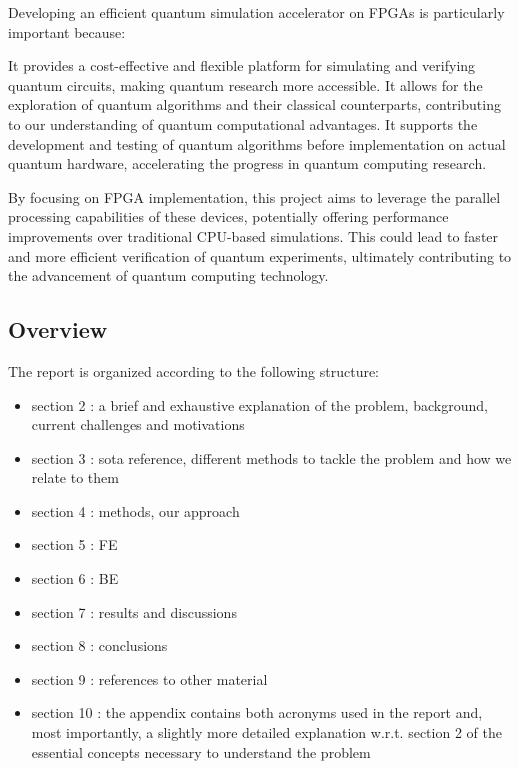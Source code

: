 \documentclass[12pt,oneside,a4paper]{article}
\begin{document}
Developing an efficient quantum simulation accelerator on FPGAs is particularly important because:

It provides a cost-effective and flexible platform for simulating and verifying quantum circuits, making quantum research more accessible.
It allows for the exploration of quantum algorithms and their classical counterparts, contributing to our understanding of quantum computational advantages.
It supports the development and testing of quantum algorithms before implementation on actual quantum hardware, accelerating the progress in quantum computing research.

By focusing on FPGA implementation, this project aims to leverage the parallel processing capabilities of these devices, potentially offering performance improvements over traditional CPU-based simulations. This could lead to faster and more efficient verification of quantum experiments, ultimately contributing to the advancement of quantum computing technology.


\subsection{Overview}
The report is organized according to the following structure:
\begin{itemize}
	\item section 2 : a brief and exhaustive explanation of the problem, background, current challenges and motivations
	\item section 3 : sota reference, different methods to tackle the problem and how we relate to them
	\item section 4 : methods, our approach
	\item section 5 : FE
	\item section 6 : BE
	\item section 7 : results and discussions
	\item section 8 : conclusions
	\item section 9 : references to other material
	\item section 10 : the appendix contains both acronyms used in the report and, most importantly, a slightly more detailed explanation w.r.t. section 2 of the essential concepts necessary to understand the problem
\end{itemize}



\end{document}
